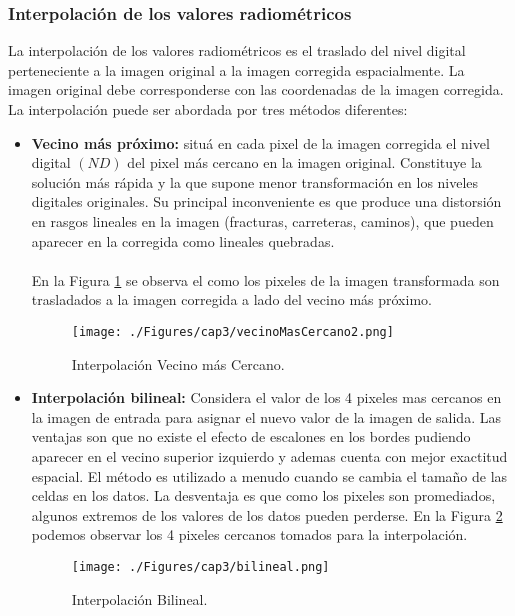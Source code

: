 \subsubsection{Interpolaci\'on de los valores radiom\'etricos}
La interpolaci\'on de los valores radiom\'etricos es el traslado del nivel digital perteneciente a la imagen original a la imagen corregida espacialmente. La imagen original debe corresponderse con las coordenadas de la imagen corregida. La interpolaci\'on puede ser abordada por tres m\'etodos diferentes:
	\begin{itemize}
		\item \textbf{Vecino m\'as pr\'oximo:} situ\'a en cada pixel de la imagen corregida el nivel digital $ (ND) $ del pixel m\'as cercano en la imagen original. Constituye la soluci\'on m\'as r\'apida y la que supone menor transformaci\'on en los niveles digitales originales. Su principal inconveniente es que produce una distorsi\'on en rasgos lineales en la imagen (fracturas, carreteras, caminos), que pueden aparecer en la corregida como lineales quebradas. \\~\\
En la Figura \ref{fig:vecinoMasCercano2} se observa el como los pixeles de la imagen transformada son trasladados a la imagen corregida a lado del vecino m\'as pr\'oximo.
				    \begin{figure}[H]
				    	\centering
				    	\texttt{[image: ./Figures/cap3/vecinoMasCercano2.png]}
				    	\caption{Interpolaci\'on Vecino m\'as Cercano.}
				    	\label{fig:vecinoMasCercano2}
				    \end{figure}
		
		\item \textbf{Interpolaci\'on bilineal:} Considera el valor de los 4 pixeles mas cercanos en la imagen de entrada para asignar el nuevo valor de la imagen de salida. Las ventajas son que no existe el efecto de escalones en los bordes pudiendo aparecer en el vecino superior izquierdo y ademas cuenta con mejor exactitud espacial. El m\'etodo es utilizado a menudo cuando se cambia el tama\~{n}o de las celdas en los datos. La desventaja es que como los pixeles son promediados, algunos extremos de los valores de los datos pueden perderse. En la Figura \ref{fig:bilineal2} podemos observar los 4 pixeles cercanos tomados para la interpolaci\'on.
		\begin{figure}[H]
			\centering
			\texttt{[image: ./Figures/cap3/bilineal.png]}
			\caption{Interpolaci\'on Bilineal.}
			\label{fig:bilineal2}
		\end{figure}
		

\end{itemize}
